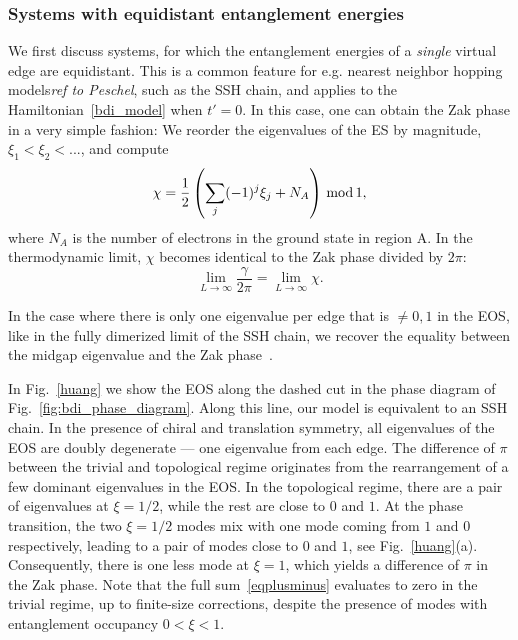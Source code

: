 \documentclass[twocolumn,amsmath,longbibliography,amssymb,superscriptaddress]{revtex4-1}
\newcommand{\mariac}[1]{{\it\color{cyan}#1}}
\begin{document}
\subsubsection{Systems with equidistant entanglement energies}
We first discuss systems, for which the entanglement energies of a \emph{single} virtual edge are equidistant. 
This is a common feature for e.g. nearest neighbor hopping models\mariac{ref to Peschel}, such as the SSH chain, and applies to the Hamiltonian~\ref{bdi_model} when $t'=0$. 
In this case, one can obtain the Zak phase in a very simple fashion: We reorder the eigenvalues of the ES by magnitude, $\xi_1 < \xi_2 < ...$, and compute
\begin{equation}
\chi = \frac{1}{2}\left(\sum_j (-1)^j \xi_j+N_A\right) \, {\rm mod} \, 1,
\label{eqplusminus}
\end{equation}
where $N_A$ is the number of electrons in the ground state in region A. 
In the thermodynamic limit, $\chi$ becomes identical to the Zak phase divided by $2\pi$:
\begin{equation}
\lim_{L \rightarrow \infty} \frac{\gamma}{2\pi} = \lim_{L \rightarrow \infty} \chi.
\end{equation}

In the case where there is only one eigenvalue per edge that is $\neq 0,1$ in  the EOS, like in the fully dimerized limit of the SSH chain, we recover the equality between the midgap eigenvalue and the Zak phase~\cite{Ryu2006}. 

In Fig.~\ref{huang} we show  the EOS along the dashed cut in the phase diagram of Fig.~\ref{fig:bdi_phase_diagram}. 
Along this line, our model is equivalent to an SSH chain. 
In the presence of chiral and translation symmetry, all eigenvalues of the EOS are doubly degenerate --- one eigenvalue from each edge. 
The difference of $\pi$ between the trivial and topological regime originates from the rearrangement of a few dominant eigenvalues in the EOS. 
In the topological regime, there are a pair of eigenvalues at $\xi=1/2$, while the rest are close to $0$ and $1$. 
At the phase transition, the two $\xi=1/2$ modes mix with one mode coming from $1$ and $0$ respectively, leading to a pair of modes close to $0$ and $1$, see Fig.~\ref{huang}(a). 
Consequently, there is one less mode at $\xi=1$, which yields a difference of $\pi$ in the Zak phase. 
Note that the full sum~\ref{eqplusminus}  evaluates to zero in the trivial regime, up to finite-size corrections, despite the presence of modes with entanglement occupancy $0<\xi<1$. 
\end{document}
